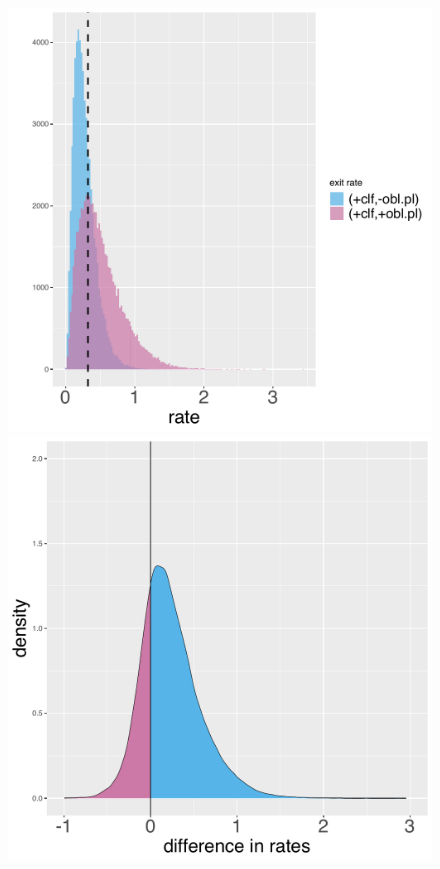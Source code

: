 \documentclass[11pt]{article}
\begin{document}
\begin{figure}[h!]
%
\begin{minipage}[t]{.45\linewidth}
\includegraphics[width=\linewidth]{code/syn_rates.pdf}
\end{minipage}
\hspace{.05\linewidth}
\begin{minipage}[t]{.45\linewidth}
\includegraphics[width=\linewidth]{code/syn_diff.pdf}

\end{minipage}
\end{figure}
\end{document}
